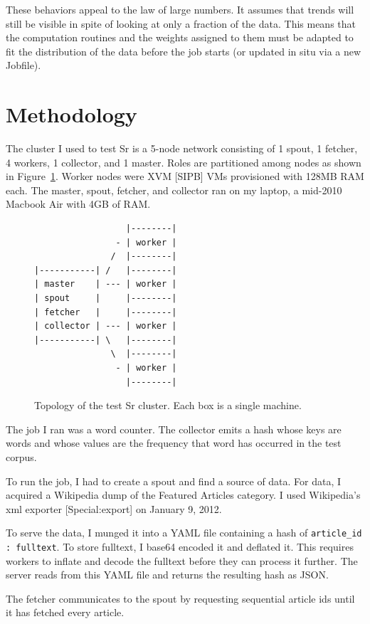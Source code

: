 \documentclass[12pt]{article}
\begin{document}
These behaviors appeal to the law of large numbers. It assumes that trends will still be visible in spite of looking at only a fraction of the data. This means that the computation routines and the weights assigned to them must be adapted to fit the distribution of the data before the job starts (or updated in situ via a new Jobfile).

\section{Methodology}
\label{sec:methodology}
The cluster I used to test Sr is a 5-node network consisting of 1 spout, 1 fetcher, 4 workers, 1 collector, and 1 master. Roles are partitioned among nodes as shown in Figure~\ref{fig:clusterDiagram}. Worker nodes were XVM [SIPB] VMs provisioned with 128MB RAM each. The master, spout, fetcher, and collector ran on my laptop, a mid-2010 Macbook Air with 4GB of RAM.

\begin{figure}
\begin{verbatim}
                  |--------|
                - | worker |
               /  |--------|
|-----------| /   |--------|
| master    | --- | worker |
| spout     |     |--------|
| fetcher   |     |--------|
| collector | --- | worker |
|-----------| \   |--------|
               \  |--------|
                - | worker |
                  |--------|

\end{verbatim}
\caption{Topology of the test Sr cluster. Each box is a single machine.}
\label{fig:clusterDiagram}
\end{figure}

The job I ran was a word counter. The collector emits a hash whose keys are words and whose values are the frequency that word has occurred in the test corpus.

To run the job, I had to create a spout and find a source of data. For data, I acquired a Wikipedia dump of the Featured Articles category. I used Wikipedia’s xml exporter [Special:export] on January 9, 2012.

To serve the data, I munged it into a YAML file containing a hash of \lstinline[language=Ruby]{article_id : fulltext}. To store fulltext, I base64 encoded it and deflated it. This requires workers to inflate and decode the fulltext before they can process it further. The server reads from this YAML file and returns the resulting hash as JSON.

The fetcher communicates to the spout by requesting sequential article ids until it has fetched every article.
\end{document}
